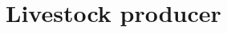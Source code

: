 \documentclass[one column,a4paper]{article}
\theoremstyle{definition}
\newcommand{\DiscFact}			{\mathsf{df}_y}
\newcommand{\Cost}			{\mathscr{C}}
\newcommand{\Area}			{{A}}
\newcommand{\pr}			{\pi}
\newcommand{\Q}			{\mathcal{Q}}
\newcommand{\C}			{C} %
\newcommand{\F}			{F} %
\newcommand{\Yld}			{\mathcal{Y}_{ynf}}
\newcommand{\QFf}			{\textcolor{blue} {\Q^{\F}_{ynf}}}
\newcommand{\piF}				{\textcolor{dgreen} {\pr^{\F}_{ynf}}}
\newcommand{\CsF}				{\textcolor{red} {\Cost^{\F}_{ynf}}}
\newcommand{\CsConv}[1][y]		{\textcolor{red} {\Cost^{\text{conv}}_{#1n}}}
\newcommand{\CsChg}[1][y]		{\textcolor{red} {\Cost^{\text{change}}_{#1n}}}
\newcommand{\AF}[1][ynf]		{\textcolor{cyan}{\Area^{\F}_{{#1}}}}
\numberwithin{equation}			{section}
\newcommand{\da}			{\textcolor{teal} {\delta^1_{yn}}}
\newcommand{\db}			{\textcolor{teal} {\delta^2_{ynf}}}
\begin{document}




\section{Livestock producer} %
\end{document}
